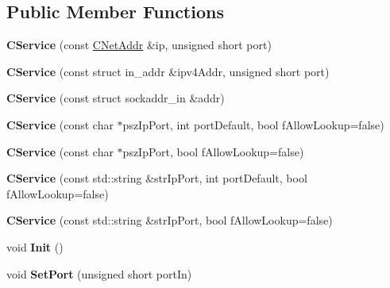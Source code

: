 \subsection*{Public Member Functions}
\begin{DoxyCompactItemize}
\item 
\mbox{\label{class_c_service_a43a0d18387ce3837d48020da47a1087c}} 
{\bfseries C\+Service} (const \mbox{\hyperlink{class_c_net_addr}{C\+Net\+Addr}} \&ip, unsigned short port)
\item 
\mbox{\label{class_c_service_a1fcc14e589f6d3e92b43707a5f71368f}} 
{\bfseries C\+Service} (const struct in\+\_\+addr \&ipv4\+Addr, unsigned short port)
\item 
\mbox{\label{class_c_service_aa54fd9204530445647cd3d45056881e9}} 
{\bfseries C\+Service} (const struct sockaddr\+\_\+in \&addr)
\item 
\mbox{\label{class_c_service_a75b2a3cfa16642b0fcd74382203a9fdc}} 
{\bfseries C\+Service} (const char $\ast$psz\+Ip\+Port, int port\+Default, bool f\+Allow\+Lookup=false)
\item 
\mbox{\label{class_c_service_ab8f5f4ae4e99a4edad8ba48642e36137}} 
{\bfseries C\+Service} (const char $\ast$psz\+Ip\+Port, bool f\+Allow\+Lookup=false)
\item 
\mbox{\label{class_c_service_a677f74b3520148f3e47a19bb9986922b}} 
{\bfseries C\+Service} (const std\+::string \&str\+Ip\+Port, int port\+Default, bool f\+Allow\+Lookup=false)
\item 
\mbox{\label{class_c_service_a19a7a713dd9a30b2f78260e61d9a2604}} 
{\bfseries C\+Service} (const std\+::string \&str\+Ip\+Port, bool f\+Allow\+Lookup=false)
\item 
\mbox{\label{class_c_service_aee07d7f18e672f16d26359e3cab779ff}} 
void {\bfseries Init} ()
\item 
\mbox{\label{class_c_service_a3dedc3f12aa21bdbf1068b054d3e3d39}} 
void {\bfseries Set\+Port} (unsigned short port\+In)
\item 

\end{DoxyCompactItemize}
